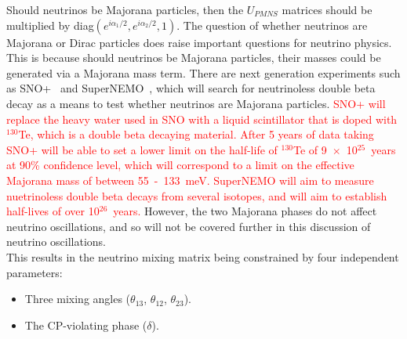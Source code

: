 Should neutrinos be Majorana particles, then the $U_{PMNS}$ matrices should be multiplied by diag$\left(e^{i\alpha_1/2}, e^{i\alpha_2/2}, 1\right)$. The question of whether neutrinos are Majorana or Dirac particles does raise important questions for neutrino physics. This is because should neutrinos be Majorana particles, their masses could be generated via a Majorana mass term. There are next generation experiments such as SNO+~\citep{SNO+} and SuperNEMO~\citep{SuperNEMO}, which will search for neutrinoless double beta decay as a means to test whether neutrinos are Majorana particles. \textcolor{red}{SNO+ will replace the heavy water used in SNO with a liquid scintillator that is doped with $^{130}$Te, which is a double beta decaying material. After 5 years of data taking SNO+ will be able to set a lower limit on the half-life of $^{130}$Te of 9~$\times$~10$^{25}$~years at 90\% confidence level, which will correspond to a limit on the effective Majorana mass of between 55~-~133~meV. SuperNEMO will aim to measure nuetrinoless double beta decays from several isotopes, and will aim to establish half-lives of over 10$^{26}$~years.} However, the two Majorana phases do not affect neutrino oscillations, and so will not be covered further in this discussion of neutrino oscillations. \\

This results in the neutrino mixing matrix being constrained by four independent parameters:
\begin{itemize}
 \item Three mixing angles ($\theta_{13}$, $\theta_{12}$, $\theta_{23}$).
 \item The CP-violating phase ($\delta$).
\end{itemize}

